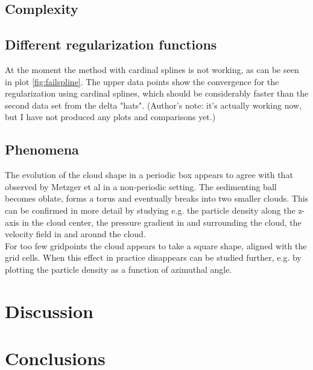 \documentclass[a4paper,twoside=false,abstract=false,numbers=noenddot,
titlepage=false,headings=small,parskip=half,version=last]{scrartcl}
\begin{document}
\subsection{Complexity}
\subsection{Different regularization functions}
At the moment the method with cardinal splines is not working, as can be seen in plot \ref{fig:failspline}. The upper data points show the convergence for the regularization using cardinal splines, which should be considerably faster than the second data set from the delta "hats". (Author's note: it's actually working now, but I have not produced any plots and comparisons yet.)

\subsection{Phenomena}
The evolution of the cloud shape in a periodic box appears to agree with that observed by Metzger et al \cite{fallingclouds} in a non-periodic setting. The sedimenting ball becomes oblate, forms a torus and eventually breaks into two smaller clouds. This can be confirmed in more detail by studying e.g. the particle density along the z-axis in the cloud center, the pressure gradient in and surrounding the cloud, the velocity field in and around the cloud.\\
For too few gridpoints the cloud appears to take a square shape, aligned with the grid cells. When this effect in practice disappears can be studied further, e.g. by plotting the particle density as a function of azimuthal angle.\\

\section{Discussion}

\section{Conclusions}
\end{document}
